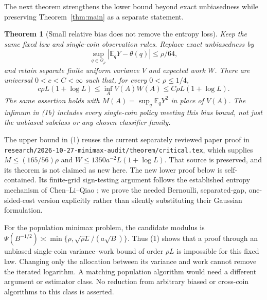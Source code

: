\documentclass[11pt]{article}
\newtheorem{theorem}{Theorem}
\newcommand{\E}{\mathbb E}
\begin{document}
The next theorem strengthens the lower bound beyond exact unbiasedness while
preserving Theorem~\ref{thm:main} as a separate statement.

\begin{theorem}[Small relative bias does not remove the entropy loss]\label{thm:bias}
Keep the same fixed law and single-coin observation rules. Replace exact
unbiasedness by
\[
 \sup_{q\in\mathcal Q_\rho}|\E_qY-\theta(q)|\le\rho/64,
\]
and retain separate finite uniform variance $V$ and expected work $W$.
There are universal $0<c<C<\infty$ such that, for every $0<\rho\le1/4$,
\[
 c\rho L(1+\log L)
 \le\inf_A V(A)W(A)
 \le C\rho L(1+\log L).                                 \tag{1b}
\]
The same assertion holds with $M(A)=\sup_q\E_qY^2$ in place of $V(A)$.
The infimum in (1b) includes every single-coin policy meeting this bias bound,
not just the unbiased subclass or any chosen classifier family.
\end{theorem}

The upper bound in (1) reuses the current separately reviewed paper proof in
\texttt{research/2026-10-27-minimax-audit/theorem/critical.tex}, which supplies
$M\le(165/56)\rho$ and $W\le1350a^{-2}L(1+\log L)$.
That source is preserved, and its theorem is not claimed as new here.
The new lower proof below is self-contained. Its finite-grid sign-testing
argument follows the established entropy mechanism of Chen--Li--Qiao
\cite[Lemma 4.1 and Appendix D]{clq}; we prove the needed Bernoulli,
separated-gap, one-sided-cost version explicitly rather than silently
substituting their Gaussian formulation.

For the population minimax problem, the candidate modulus is
$\Psi(B^{-1/2})\asymp\min\{\rho,\sqrt{\rho L}/(a\sqrt B)\}$.
Thus (1) shows that a proof through an unbiased single-coin variance--work
bound of order $\rho L$ is impossible for this fixed law. Changing only the
allocation between its variance and work cannot remove the iterated logarithm.
A matching population algorithm would need a different argument or estimator
class. No reduction from arbitrary biased or cross-coin algorithms to this
class is asserted.
\end{document}
